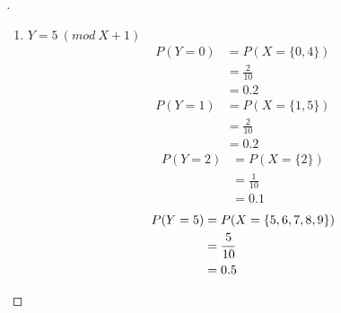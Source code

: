 \documentclass[paper=usletter, fontsize=12pt]{article}
\begin{document}
\begin{enumerate}
\begin{proof}[\unskip\nopunct]
\begin{enumerate}
                \item $Y = 5 \ (mod \ X + 1)$\\
                \begin{align*}
                    P(Y = 0) & = P(X = \{0,4\})\\
                    & = \frac{2}{10}\\
                    & = 0.2
                \end{align*}
                \begin{align*}
                    P(Y = 1) & = P(X = \{1,5\})\\
                    & = \frac{2}{10}\\
                    & = 0.2
                \end{align*}
                \begin{align*}
                    P(Y = 2) & = P(X = \{2\})\\
                    & = \frac{1}{10}\\
                    & = 0.1
                \end{align*}
                \begin{align*}
                    P(Y = 5) & = P(X = \{5,6,7,8,9\})\\
                    & = \frac{5}{10}\\
                    & = 0.5 \qedhere
                \end{align*}

            \end{enumerate}

        \end{proof}
        \vspace{0.2in}


\end{enumerate}
\end{document}

